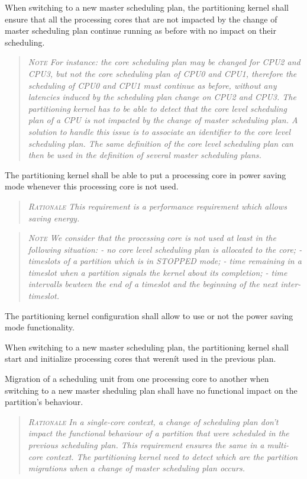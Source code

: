 When switching to a new master scheduling plan, the partitioning kernel shall ensure that all the processing cores that are not impacted by the change of master scheduling plan continue running as before with no impact on their scheduling.
\begin{quote}\it
\textsc{Note}
For instance: the core scheduling plan may be changed for CPU2 and CPU3, but not the core scheduling plan of CPU0 and CPU1, therefore the scheduling of CPU0 and CPU1 must continue as before, without any latencies induced by the scheduling plan change on CPU2 and CPU3.
The partitioning kernel has to be able to detect that the core level scheduling plan of a CPU is not impacted by the change of master scheduling plan. A solution to handle this issue is to associate an identifier to the core level scheduling plan. The same definition of the core level scheduling plan can then be used in the definition of several master scheduling plans.
\end{quote}

The partitioning kernel shall be able to put a processing core in power saving mode whenever this processing core is not used.
\begin{quote}\it
\textsc{Rationale}
This requirement is a performance requirement which allows saving energy.
\end{quote}
\begin{quote}\it
\textsc{Note}
We consider that the processing core is not used at least in the following situation:
- no core level scheduling plan is allocated to the core;
- timeslots of a partition which is in STOPPED mode;
- time remaining in a timeslot when a partition signals the kernel about its completion;
- time intervalls bewteen the end of a timeslot and the beginning of the next inter-timeslot.
\end{quote}

The partitioning kernel configuration shall allow to use or not the power saving mode functionality.

When switching to a new master scheduling plan, the partitioning kernel shall start and initialize processing cores that werenít used in the previous plan.

Migration of a scheduling unit from one processing core to another when switching to a new master sheduling plan shall have no functional impact on the partition's behaviour.
\begin{quote}\it
\textsc{Rationale}
In a single-core context, a change of scheduling plan don't impact the functional behaviour of a partition that were scheduled in the previous scheduling plan. This requirement ensures the same in a multi-core context. The partitioning kernel need to detect which are the partition migrations when a change of master scheduling plan occurs.
\end{quote}

